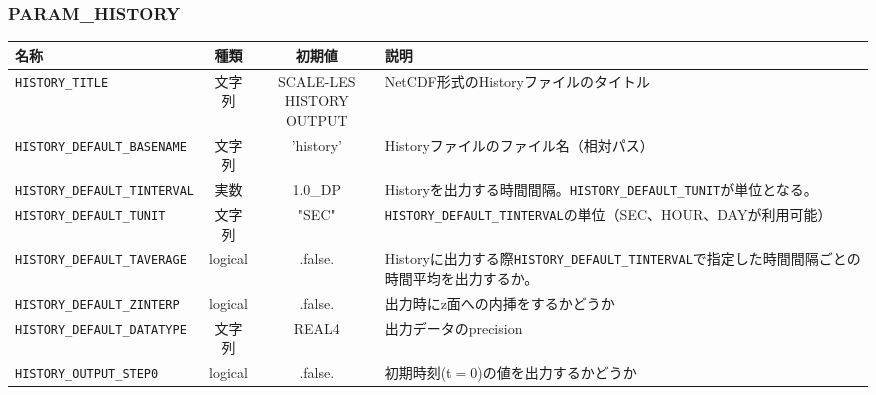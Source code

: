 \subsubsection{PARAM\_HISTORY}
\begin{tabularx}{150mm}{|l|c|c|X|} \hline
 \rowcolor[gray]{0.9} 名称 & 種類 & 初期値 & 説明 \\ \hline
 \verb|HISTORY_TITLE| & 文字列 & \shortstack{SCALE-LES \\ HISTORY OUTPUT} & NetCDF形式のHistoryファイルのタイトル \\ \hline
 \verb|HISTORY_DEFAULT_BASENAME| & 文字列 & 'history' & Historyファイルのファイル名（相対パス） \\ \hline
 \verb|HISTORY_DEFAULT_TINTERVAL| & 実数 & 1.0\_DP & Historyを出力する時間間隔。\verb|HISTORY_DEFAULT_TUNIT|が単位となる。 \\ \hline
 \verb|HISTORY_DEFAULT_TUNIT| & 文字列 & "SEC" & \verb|HISTORY_DEFAULT_TINTERVAL|の単位（SEC、HOUR、DAYが利用可能） \\ \hline
 \verb|HISTORY_DEFAULT_TAVERAGE| & logical & .false. & Historyに出力する際\verb|HISTORY_DEFAULT_TINTERVAL|で指定した時間間隔ごとの時間平均を出力するか。 \\ \hline
 \verb|HISTORY_DEFAULT_ZINTERP| & logical & .false. & 出力時にz面への内挿をするかどうか \\ \hline
 \verb|HISTORY_DEFAULT_DATATYPE| & 文字列 & REAL4 & 出力データのprecision \\ \hline
 \verb|HISTORY_OUTPUT_STEP0| & logical & .false. & 初期時刻(t$=$0)の値を出力するかどうか \\ \hline
\end{tabularx}


